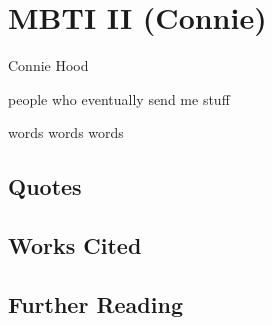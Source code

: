 \chapter{MBTI II (Connie)}

\begin{authors}
	Connie Hood
\end{authors}

\begin{authors}
	people who eventually send me stuff
\end{authors}

words words words


\section{Quotes}

\section{Works Cited}

\section{Further Reading}


